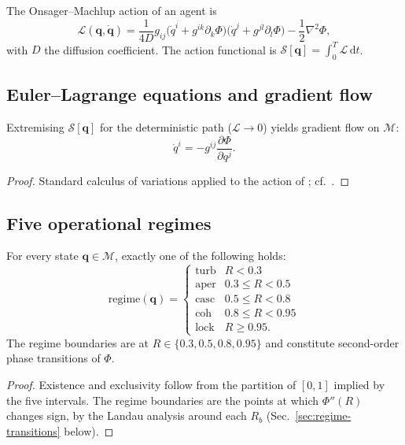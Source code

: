 \documentclass[11pt,twocolumn,a4paper]{article}
\newcommand{\M}{\mathcal{M}}
\newcommand{\dd}{\,\mathrm{d}}
\newcommand{\qvec}{\mathbf{q}}
\newcommand{\Lag}{\mathcal{L}}
\newcommand{\Pot}{\Phi}
\begin{document}
\begin{definition}\label{def:action}
The Onsager--Machlup action of an agent is
\[
\Lag(\qvec,\dot{\qvec})=\frac{1}{4D}g_{ij}\bigl(\dot q^i+g^{ik}\partial_k\Pot\bigr)
\bigl(\dot q^j+g^{jl}\partial_l\Pot\bigr)-\frac{1}{2}\nabla^2\Pot,
\]
with $D$ the diffusion coefficient. The action functional is
$\mathcal{S}[\qvec]=\int_0^T\Lag\dd t$.
\end{definition}

\subsection{Euler--Lagrange equations and gradient flow}

\begin{theorem}\label{thm:gradflow}
Extremising $\mathcal{S}[\qvec]$ for the deterministic path
($\Lag\to 0$) yields gradient flow on $\M$:
\[
\dot q^i = -g^{ij}\frac{\partial\Pot}{\partial q^j}.
\]
\end{theorem}

\begin{proof}
Standard calculus of variations applied to the action of
; cf.~\cite{onsager1953,machlup1953,graham1977}.
\end{proof}

\subsection{Five operational regimes}

\begin{theorem}\label{thm:five-regimes}
For every state $\qvec\in\M$, exactly one of the following holds:
\[
\mathrm{regime}(\qvec)=\begin{cases}
\mathrm{turb} & R<0.3\\
\mathrm{aper} & 0.3\le R<0.5\\
\mathrm{casc} & 0.5\le R<0.8\\
\mathrm{coh} & 0.8\le R<0.95\\
\mathrm{lock} & R\ge 0.95.
\end{cases}
\]
The regime boundaries are at $R\in\{0.3,0.5,0.8,0.95\}$ and constitute
second-order phase transitions of $\Pot$.
\end{theorem}

\begin{proof}
Existence and exclusivity follow from the partition of $[0,1]$
implied by the five intervals. The regime boundaries are the points at
which $\Pot''(R)$ changes sign, by the Landau analysis around each
$R_b$ (Sec.~\ref{sec:regime-transitions} below).
\end{proof}
\end{document}

